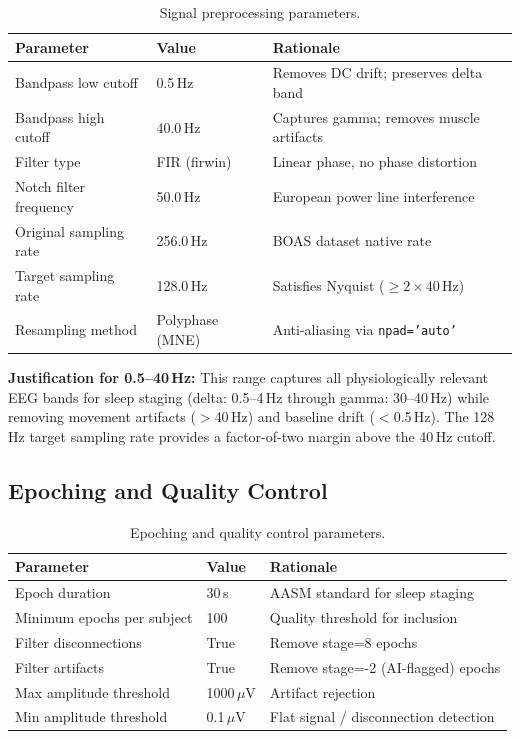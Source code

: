 \begin{table}[h]
\centering
\caption{Signal preprocessing parameters.}
\label{tab:preprocessing}
\begin{tabular}{l l l}
\toprule
\textbf{Parameter} & \textbf{Value} & \textbf{Rationale} \\
\midrule
Bandpass low cutoff     & 0.5\,Hz   & Removes DC drift; preserves delta band \\
Bandpass high cutoff    & 40.0\,Hz  & Captures gamma; removes muscle artifacts \\
Filter type             & FIR (firwin) & Linear phase, no phase distortion \\
Notch filter frequency  & 50.0\,Hz  & European power line interference \\
Original sampling rate  & 256.0\,Hz & BOAS dataset native rate \\
Target sampling rate    & 128.0\,Hz & Satisfies Nyquist ($\geq 2 \times 40\,\text{Hz}$) \\
Resampling method       & Polyphase (MNE) & Anti-aliasing via \texttt{npad='auto'} \\
\bottomrule
\end{tabular}
\end{table}

\textbf{Justification for 0.5--40\,Hz:} This range captures all physiologically relevant EEG bands for sleep staging (delta: 0.5--4\,Hz through gamma: 30--40\,Hz) while removing movement artifacts ($>$40\,Hz) and baseline drift ($<$0.5\,Hz). The 128\,Hz target sampling rate provides a factor-of-two margin above the 40\,Hz cutoff.

\subsection{Epoching and Quality Control}

\begin{table}[h]
\centering
\caption{Epoching and quality control parameters.}
\label{tab:epoching}
\begin{tabular}{l l l}
\toprule
\textbf{Parameter} & \textbf{Value} & \textbf{Rationale} \\
\midrule
Epoch duration             & 30\,s   & AASM standard for sleep staging \\
Minimum epochs per subject & 100     & Quality threshold for inclusion \\
Filter disconnections      & True    & Remove stage=8 epochs \\
Filter artifacts           & True    & Remove stage=-2 (AI-flagged) epochs \\
Max amplitude threshold    & 1000\,$\mu$V & Artifact rejection \\
Min amplitude threshold    & 0.1\,$\mu$V  & Flat signal / disconnection detection \\
\bottomrule
\end{tabular}
\end{table}

